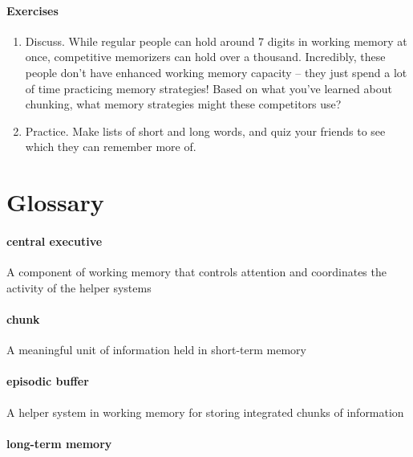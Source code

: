 \documentclass[
]{krantz}
\providecommand{\tightlist}{%
  \setlength{\itemsep}{0pt}\setlength{\parskip}{0pt}}
\begin{document}
\paragraph*{Exercises}\label{exercises-3}

\begin{enumerate}
\def\labelenumi{\arabic{enumi}.}
\tightlist
\item
  Discuss. While regular people can hold around 7 digits in working memory at once, competitive memorizers can hold over a thousand. Incredibly, these people don't have enhanced working memory capacity -- they just spend a lot of time practicing memory strategies! Based on what you've learned about chunking, what memory strategies might these competitors use?
\item
  Practice. Make lists of short and long words, and quiz your friends to see which they can remember more of.
\end{enumerate}

\section{Glossary}\label{glossary-3}

\paragraph*{central executive}\label{central-executive}

A component of working memory that controls attention and coordinates the activity of the helper systems

\paragraph*{chunk}\label{chunk}

A meaningful unit of information held in short-term memory

\paragraph*{episodic buffer}\label{episodic-buffer}

A helper system in working memory for storing integrated chunks of information

\paragraph*{long-term memory}\label{long-term-memory}
\end{document}
